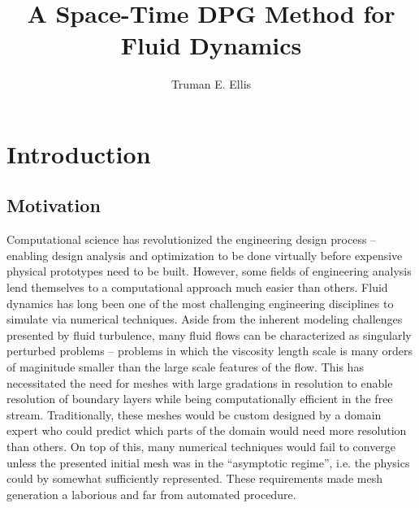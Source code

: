 \documentclass{report}
\author{Truman E. Ellis}
\title{A Space-Time DPG Method for Fluid Dynamics}
\begin{document}
\titlepage

\tableofcontents   %



\chapter{Introduction}



\section{Motivation} 

Computational science has revolutionized the engineering design process -- enabling design analysis
and optimization to be done virtually before expensive physical prototypes need to be built.
However, some fields of engineering analysis lend themselves to a computational approach much easier
than others. 
Fluid dynamics has long been one of the most challenging engineering disciplines to simulate via numerical techniques.
Aside from the inherent modeling challenges presented by fluid turbulence, many fluid flows can be characterized as singularly perturbed problems 
-- problems in which the viscosity length scale is many orders of maginitude smaller than the large scale features of the flow.
This has necessitated the need for meshes with large gradations in resolution to enable resolution of boundary layers while being computationally efficient in the free stream.
Traditionally, these meshes would be custom designed by a domain expert who could predict which parts of the domain would need more resolution than others. 
On top of this, many numerical techniques would fail to converge unless the presented initial mesh was in the ``asymptotic regime'', 
i.e. the physics could by somewhat sufficiently represented.
These requirements made mesh generation a laborious and far from automated procedure.
\end{document}
